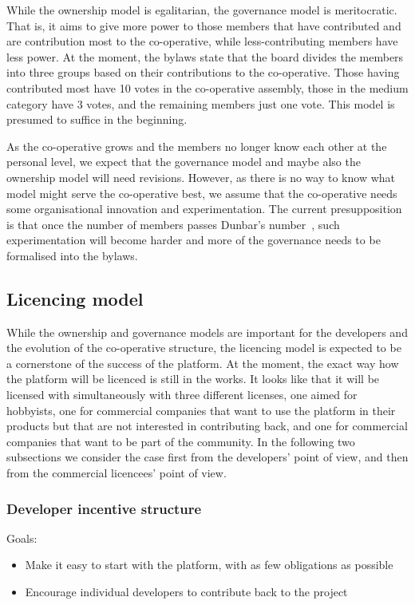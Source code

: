 \documentclass[draft,a4paper]{siamltex}
\begin{document}
While the ownership model is egalitarian, the governance model is
meritocratic.  That is, it aims to give more power to those members
that have contributed and are contribution most to the co-operative,
while less-contributing members have less power.  At the moment, the
bylaws state that the board divides the members into three groups
based on their contributions to the co-operative.  Those having
contributed most have 10 votes in the co-operative assembly, those in
the medium category have 3 votes, and the remaining members just one
vote.  This model is presumed to suffice in the beginning.

As the co-operative grows and the members no longer know each other at
the personal level, we expect that the governance model and maybe also
the ownership model will need revisions.  However, as there is no way
to know what model might serve the co-operative best, we assume that
the co-operative needs some organisational innovation and
experimentation.  The current presupposition is that once the number
of members passes Dunbar's number~\cite{reference-needed}, such
experimentation will become harder and more of the governance needs to
be formalised into the bylaws.

\subsection{Licencing model}
\label{ssec:licencing}

While the ownership and governance models are important for the
developers and the evolution of the co-operative structure, the
licencing model is expected to be a cornerstone of the success of the
platform.  At the moment, the exact way how the platform will be
licenced is still in the works.  It looks like that it will be
licensed with simultaneously with three different licenses, one aimed
for hobbyists, one for commercial companies that want to use the
platform in their products but that are not interested in contributing
back, and one for commercial companies that want to be part of the
community.  In the following two subsections we consider the case
first from the developers' point of view, and then from the commercial
licencees' point of view.

\subsubsection{Developer incentive structure}

Goals:
\begin{itemize}
  \item Make it easy to start with the platform, with as few
    obligations as possible
  \item Encourage individual developers to contribute back to the
    project
\end{itemize}
\end{document}

